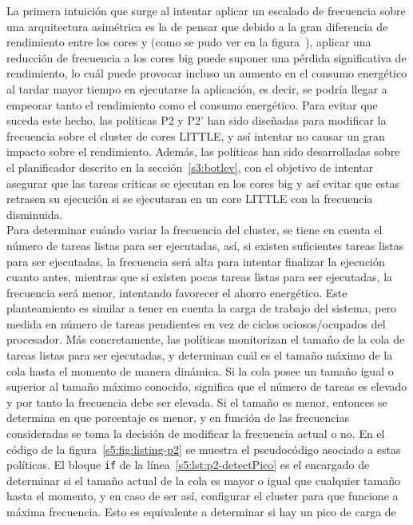 La primera intuición que surge al intentar aplicar un escalado de
frecuencia sobre una arquitectura asimétrica es la de pensar que debido a
la gran diferencia de rendimiento entre los cores \BIG y \LITTLE (como se
pudo ver en la figura~), aplicar una reducción de frecuencia a
los cores big puede suponer una pérdida significativa de rendimiento, lo
cuál puede provocar incluso un aumento en el consumo energético al tardar
mayor tiempo en ejecutarse la aplicación, es decir, se podría llegar a
empeorar tanto el rendimiento como el consumo energético. Para evitar que
suceda este hecho, las políticas P2 y P2' han sido diseñadas para modificar
la frecuencia sobre el cluster de cores LITTLE, y así intentar no causar un
gran impacto sobre el rendimiento. Además, las políticas han sido
desarrolladas sobre el planificador \botlev descrito en la
sección~\ref{s3:botlev}, con el objetivo de intentar asegurar que las
tareas críticas se ejecutan en los cores big y así evitar que estas
retrasen su ejecución si se ejecutaran en un core LITTLE con la frecuencia
disminuida.\\
Para determinar cuándo variar la frecuencia del cluster, se tiene en cuenta
el número de tareas listas para ser ejecutadas, así, si existen suficientes
tareas listas para ser ejecutadas, la frecuencia será alta para intentar
finalizar la ejecución cuanto antes, mientras que si existen pocas tareas
listas para ser ejecutadas, la frecuencia será menor, intentando favorecer
el ahorro energético. Este planteamiento es similar a tener en cuenta la
carga de trabajo del sistema, pero medida en número de tareas pendientes en
vez de ciclos ociosos/ocupados del procesador. Más concretamente, las
políticas monitorizan el tamaño de la cola de tareas listas para ser
ejecutadas, y determinan cuál es el tamaño máximo de la cola hasta el
momento de manera dinámica. Si la cola posee un tamaño igual o superior al
tamaño máximo conocido, significa que el número de tareas es elevado y por
tanto la frecuencia debe ser elevada. Si el tamaño es menor, entonces se
determina en que porcentaje es menor, y en función de las frecuencias
consideradas se toma la decisión de modificar la frecuencia actual o no. En
el código de la figura~\ref{s5:fig:listing-p2} se muestra el pseudocódigo
asociado a estas políticas. El bloque \texttt{if} de la
línea~\ref{s5:lst:p2-detectPico} es el encargado de determinar si el tamaño
actual de la cola es mayor o igual que cualquier tamaño hasta el momento, y
en caso de ser así, configurar el cluster para que funcione a máxima
frecuencia. Esto es equivalente a determinar si hay un pico de carga de
